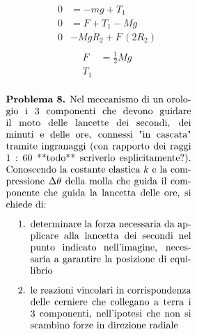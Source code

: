 \documentclass[letterpaper,10pt,italian]{jupyterBook}
\begin{document}
\sphinxAtStartPar
{}
\begin{equation*}
\begin{split}\begin{aligned}
0 & = - m g + T_1 \\
0 & = F + T_1 - M g \\
0 & - M g R_2 + F \, (2 R_2)
\end{aligned}\end{split}
\end{equation*}\begin{equation*}
\begin{split}\begin{aligned} 
  F & = \frac{1}{2} M g \\
  T_1
\end{aligned}
\end{split}
\end{equation*}\begin{equation*}
\begin{split}
\begin{minipage}[t]{.55\textwidth}
  \vspace{0pt}
  \textbf{Problema 8.}
  Nel meccanismo di un orologio i 3 componenti che devono guidare il moto delle lancette dei secondi, dei minuti e delle ore, connessi "in cascata" tramite ingranaggi (con rapporto dei raggi $1:60$ **todo** scriverlo esplicitamente?). Conoscendo la costante elastica $k$ e la compressione $\Delta \theta$ della molla che guida il componente che guida la lancetta delle ore, si chiede di:
  \begin{enumerate}
    \item determinare la forza necessaria da applicare alla lancetta dei secondi nel punto indicato nell'imagine, necessaria a garantire la posizione di equilibrio
    \item le reazioni vincolari in corrispondenza delle cerniere che collegano a terra i 3 componenti, nell'ipotesi che non si scambino forze in direzione radiale
  \end{enumerate}
\end{minipage}
\hspace{.05\textwidth}
\begin{minipage}[t]{.40\textwidth}
  \vspace{0pt}

\end{minipage}
\end{split}
\end{equation*}
\end{document}
